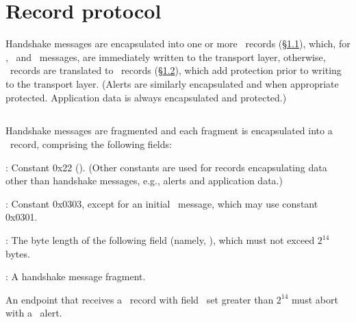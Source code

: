 \section{Record protocol}\label{sec:record}

Handshake messages are encapsulated into one or more \TLSPlaintext\ records (\S\ref{sec:TLSPlaintext}), 
which, for \ClientHello, \ServerHello\ and \HelloRetryRequest\ messages, are 
immediately written to the transport layer, otherwise, \TLSPlaintext\ records are 
translated to \TLSCiphertext\ records (\S\ref{sec:TLSCiphertext}), which add protection 
prior to writing to the transport layer. (Alerts are similarly encapsulated and when 
appropriate protected. Application data is always encapsulated and protected.)

\subsection{\TLSPlaintext}\label{sec:TLSPlaintext}

Handshake messages are fragmented and each fragment is encapsulated into a 
\TLSPlaintext\ record, comprising the following fields:

\begin{description}

\item \TLStype: Constant 0x22 (\TLShandshake). (Other constants are used for records 
  encapsulating data other than handshake messages, e.g., alerts and application 
  data.)

\item \TLSlegacyRecordVersion: Constant 0x0303, except for an initial \ClientHello\
  message, which may use constant 0x0301. 


\item \TLSlength: The byte length of the following field (namely, \TLSfragment), which must not exceed
  $2^{14}$ bytes.

\item \TLSfragment: A handshake message fragment.

\end{description}

\noindent
An endpoint that receives a \TLSPlaintext\ record with field \TLSlength\ set 
greater than $2^{14}$ must abort with a \TLSrecordOverflow\ alert.

\subsection{\TLSCiphertext}\label{sec:TLSCiphertext}

